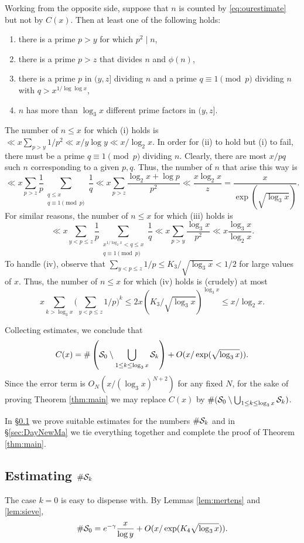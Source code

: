 \documentclass[11pt]{amsart}
\theoremstyle{remark}
\begin{document}
Working from the opposite side, suppose that $n$ is counted by \eqref{eq:ourestimate} but not by $C(x)$. Then at least one of the following holds:
\begin{enumerate}
\item there is a prime $p > y$ for which $p^2 \mid n$,
\item there is a prime $p > z$ that divides $n$ and $\phi(n)$,
\item there is a prime $p$ in $(y,z]$ dividing $n$ and a prime $q\equiv 1\pmod{p}$ dividing $n$ with $q > x^{1/\log\log{x}}$,
\item $n$ has more than $\log_3 x$ different prime factors in $(y,z]$.
\end{enumerate}
The number of $n\le x$ for which (i) holds is $\ll x\sum_{p>y} 1/p^2 \ll x/y\log{y} \ll x/\log_2 x$. In order for (ii) to hold but (i) to fail, there must be a prime $q\equiv 1\pmod{p}$ dividing $n$. Clearly, there are most $x/pq$ such $n$ corresponding to a given $p, q$. Thus, the number of $n$ that arise this way is
\[ \ll x\sum_{p > z} \frac{1}{p} \sum_{\substack{q \le x\\q\equiv 1\!\!\!\!\pmod{p}}} \frac{1}{q} \ll x\sum_{p>z} \frac{\log_2 x + \log{p}}{p^2} \ll \frac{x \log_2{x}}{z} = \frac{x}{\exp(\sqrt{\log_3 x})}. \]
For similar reasons, the number of $n\le x$ for which (iii) holds is
\[ \ll x\sum_{y < p \le z} \frac{1}{p} \sum_{\substack{x^{1/\log_2 x} < q \le x \\ q\equiv 1\!\!\!\!\pmod{p}}} \frac{1}{q} \ll x\sum_{p > y} \frac{\log_3 x}{p^2} \ll x\frac{\log_3 x}{\log_2 x}. \]
To handle (iv), observe that $\sum_{y < p \le z}1/p \le K_3/\sqrt{\log_3 x} < 1/2$ for large values of $x$. Thus, the number of $n\le x$ for which (iv) holds is (crudely) at most
\[  x\sum_{k > \log_3 x} \bigg(\sum_{y < p \le z} 1/p\bigg)^k \le 2x (K_3/\sqrt{\log_3 x})^{\log_3 x} \le x/\log_2 x. \]

Collecting estimates, we conclude that
\[ C(x) = \#\left(\mathcal{S}_0\setminus \bigcup_{1\le k\le \log_3 x} \mathcal{S}_k\right) + O(x/\exp(\sqrt{\log_3 x})). \]
Since the error term is $O_N(x/(\log_3 x)^{N+2})$ for any fixed $N$, for the sake of proving  Theorem \ref{thm:main} we may replace $C(x)$ by $\#(\mathcal{S}_0\setminus \bigcup_{1\le k\le\log_3 x} \mathcal{S}_k)$.

In \S\ref{sec:sskestimate} we prove suitable estimates for the numbers $\#\mathcal{S}_k$ and in \S\ref{sec:DayNewMa} we tie everything together and complete the proof of Theorem \ref{thm:main}.
\subsection{Estimating $\#\mathcal{S}_k$}\label{sec:sskestimate} The case $k=0$ is easy to dispense with. By Lemmas \ref{lem:mertens} and \ref{lem:sieve},
\begin{equation}\label{eq:s0estimate} \#\mathcal{S}_0 = e^{-\gamma}\frac{x}{\log y} + O(x/\exp(K_4\sqrt{\log_3 x})). \end{equation}
\end{document}
